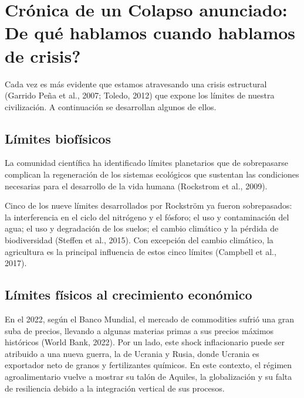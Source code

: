\documentclass[a4paper, nobind]{templates/ociamthesis}
\begin{document}
\hypertarget{colapso}{%
\section{\texorpdfstring{Crónica de un Colapso anunciado: \textquestiondown De qué hablamos cuando hablamos de crisis?}{Crónica de un Colapso anunciado: De qué hablamos cuando hablamos de crisis?}}\label{colapso}}

Cada vez es más evidente que estamos atravesando una crisis estructural
(Garrido Peña et al., 2007; Toledo, 2012) que expone los límites
de nuestra civilización. A continuación se desarrollan algunos de ellos.

\hypertarget{biofisicos}{%
\subsection{Límites biofísicos}\label{biofisicos}}

La comunidad científica ha identificado límites planetarios que de
sobrepasarse complican la regeneración de los sistemas ecológicos que
sustentan las condiciones necesarias para el desarrollo de la vida
humana (Rockstrom et al., 2009).

Cinco de los nueve límites desarrollados por Rockström ya fueron
sobrepasados: la interferencia en el ciclo del nitrógeno y el fósforo;
el uso y contaminación del agua; el uso y degradación de los suelos; el
cambio climático y la pérdida de biodiversidad (Steffen et al., 2015). Con
excepción del cambio climático, la agricultura es la principal
influencia de estos cinco límites (Campbell et al., 2017).

\hypertarget{limities_econuxf3micos}{%
\subsection{Límites físicos al crecimiento económico}\label{limities_econuxf3micos}}

En el 2022, según el Banco Mundial, el mercado de commodities sufrió una
gran suba de precios, llevando a algunas materias primas a sus precios
máximos históricos (World Bank, 2022). Por un lado, este shock
inflacionario puede ser atribuido a una nueva guerra, la de Ucrania y
Rusia, donde Ucrania es exportador neto de granos y fertilizantes
químicos. En este contexto, el régimen agroalimentario vuelve a mostrar
su talón de Aquiles, la globalización y su falta de resiliencia debido a
la integración vertical de sus procesos.
\end{document}
